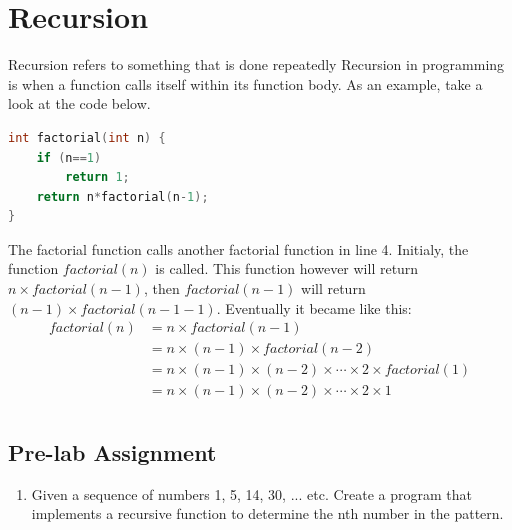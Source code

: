 \section{Recursion}
Recursion refers to something that is done repeatedly
Recursion in programming is when a function calls itself within its function body.
As an example, take a look at the code below.
\begin{lstlisting}[language=c,caption = Factorial with a recursion,label=lst:recursionexample01]
    int factorial(int n) {
    if (n==1)
        return 1;
    return n*factorial(n-1);
}
\end{lstlisting}
The factorial function calls another factorial function in line 4.
Initialy, the function $factorial(n)$ is called. This function however will return
$n\times factorial(n-1)$, then $factorial(n-1)$ will return $(n-1)\times factorial(n-1-1)$.
Eventually it became like this:
\begin{equation*}
    \begin{split}
        factorial(n)& = n \times factorial(n-1)\\
        & = n \times (n-1) \times factorial(n-2)\\
        & = n \times (n-1) \times (n-2) \times \cdots \times 2 \times factorial(1)\\
        & = n \times (n-1) \times (n-2) \times \cdots \times 2 \times 1\\
    \end{split}
\end{equation*}

\subsection{Pre-lab Assignment}
\begin{enumerate}
    \item Given a sequence of numbers 1, 5, 14, 30, ... etc. Create a program that implements a recursive function to determine the nth number in the pattern.
\end{enumerate}